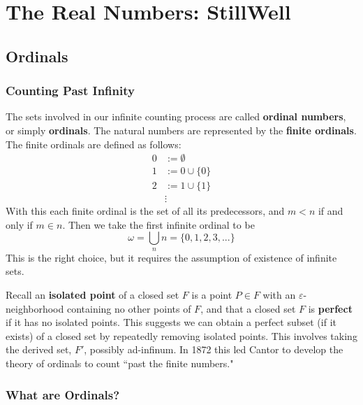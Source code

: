 \documentclass[12pt, a4paper, oneside, openright, titlepage]{book}
\begin{document}
\tableofcontents


\part{The Real Numbers: StillWell}

\chapter{Ordinals}

\section{Counting Past Infinity}

The sets involved in our infinite counting process are called \textbf{ordinal numbers}, or simply \textbf{ordinals}. The natural numbers are represented by the \textbf{finite ordinals}. The finite ordinals are defined as follows: \begin{align*}
    0 &:= \emptyset \\
    1 &:= 0\cup \{0\} \\
    2 &:= 1\cup \{1\} \\
    &\vdots
\end{align*}
With this each finite ordinal is the set of all its predecessors, and $m < n$ if and only if $m \in n$. Then we take the first infinite ordinal to be \begin{equation*}
    \omega = \bigcup_nn = \{0,1,2,3,...\}
\end{equation*}
This is the right choice, but it requires the assumption of existence of infinite sets.

Recall an \textbf{isolated point} of a closed set $F$ is a point $P \in F$ with an $\varepsilon$-neighborhood containing no other points of $F$, and that a closed set $F$ is \textbf{perfect} if it has no isolated points. This suggests we can obtain a perfect subset (if it exists) of a closed set by repeatedly removing isolated points. This involves taking the derived set, $F'$, possibly ad-infinum. In 1872 this led Cantor to develop the theory of ordinals to count ``past the finite numbers."


\section{What are Ordinals?}
\end{document}
